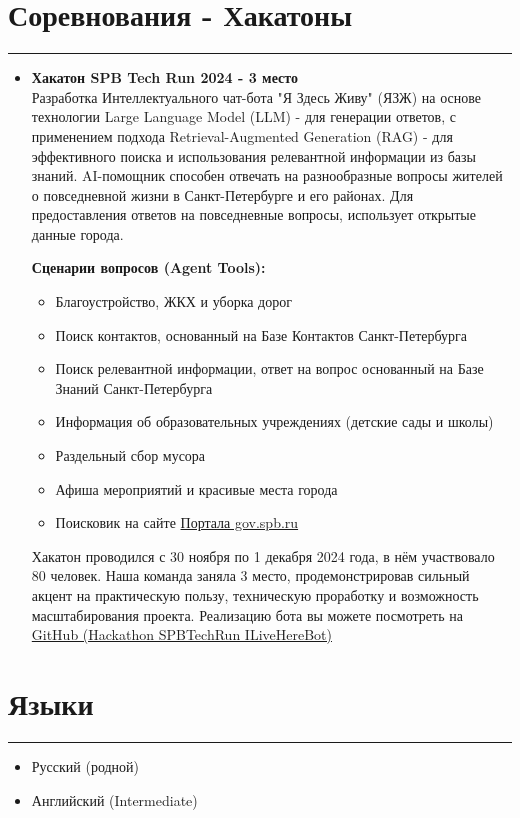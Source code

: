 \documentclass[a4paper,14pt]{article}
\begin{document}
\section*{Соревнования - Хакатоны}
\hrule
\vspace{0.5em}
\begin{itemize}
    \item \textbf{Хакатон SPB Tech Run 2024 - 3 место} \\
    Разработка Интеллектуального чат-бота "Я Здесь Живу" (ЯЗЖ) на основе технологии Large Language Model (LLM) - для генерации ответов, с применением подхода Retrieval-Augmented Generation (RAG) - для эффективного поиска и использования релевантной информации из базы знаний. AI-помощник способен отвечать на разнообразные вопросы жителей о повседневной жизни в Санкт-Петербурге и его районах. Для предоставления ответов на повседневные вопросы, использует открытые данные города.

    \textbf{Сценарии вопросов (Agent Tools):}
\begin{itemize}
        \item Благоустройство, ЖКХ и уборка дорог
        \item Поиск контактов, основанный на Базе Контактов Санкт-Петербурга
        \item Поиск релевантной информации, ответ на вопрос основанный на Базе Знаний Санкт-Петербурга
        \item Информация об образовательных учреждениях (детские сады и школы)
        \item Раздельный сбор мусора
        \item Афиша мероприятий и красивые места города
        \item Поисковик на сайте \href{https://www.gov.spb.ru/}{Портала gov.spb.ru}
\end{itemize}
    Хакатон проводился с 30 ноября по 1 декабря 2024 года, в нём участвовало 80 человек. Наша команда заняла 3 место, продемонстрировав сильный акцент на практическую пользу, техническую проработку и возможность масштабирования проекта.
    Реализацию бота вы можете посмотреть на \href{https://github.com/Denigmma/Hackathon_SPBTechRun_ILiveHereBot}{GitHub (Hackathon SPBTechRun ILiveHereBot)}
\end{itemize}


\section*{Языки}
\hrule
\vspace{0.5em}
\begin{itemize}
    \item Русский (родной)
    \item Английский (Intermediate)
\end{itemize}
\end{document}
